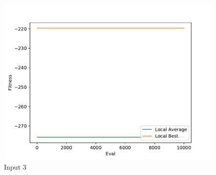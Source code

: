 \documentclass{standalone}
\begin{document}
\begin{figure}[!htb]
	\caption{Input 3}
	\label{fig:graph_3002}
	\includegraphics[width=\textwidth]{../graphs/graphs/3002.pdf}
\end{figure}
\end{document}
